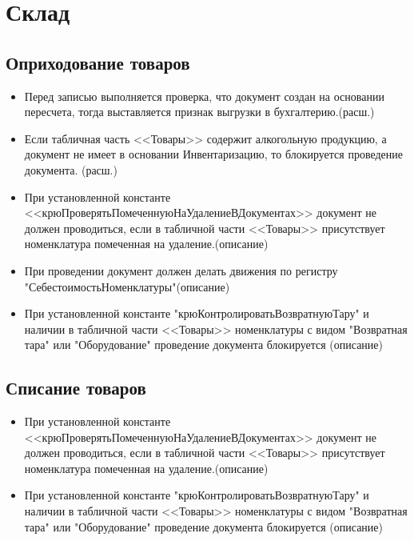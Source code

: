 \section{Склад}
\subsection{Оприходование товаров}


\begin{itemize}
	\item Перед записью выполняется проверка, что документ создан на основании пересчета, тогда выставляется признак выгрузки в бухгалтерию.(расш.)
	\item Если табличная часть <<Товары>> содержит алкогольную продукцию, а документ не имеет в основании Инвентаризацию, то блокируется проведение документа.
	(расш.)
	\item При установленной константе <<крюПроверятьПомеченнуюНаУдалениеВДокументах>>
	документ не должен проводиться, если в табличной части <<Товары>> присутствует 
	номенклатура помеченная на удаление.(описание)
	\item При проведении документ должен делать движения по регистру "СебестоимостьНоменклатуры"(описание)
	\item При установленной константе "крюКонтролироватьВозвратнуюТару" и наличии в табличной части <<Товары>> номенклатуры
	с видом "Возвратная тара" или "Оборудование" проведение документа блокируется (описание)
\end{itemize}

\subsection{Списание товаров}

\begin{itemize}
	\item При установленной константе <<крюПроверятьПомеченнуюНаУдалениеВДокументах>>
	документ не должен проводиться, если в табличной части <<Товары>> присутствует 
	номенклатура помеченная на удаление.(описание)
	\item При установленной константе "крюКонтролироватьВозвратнуюТару" и наличии в табличной части <<Товары>> номенклатуры
	с видом "Возвратная тара" или "Оборудование" проведение документа блокируется (описание)

\end{itemize}



